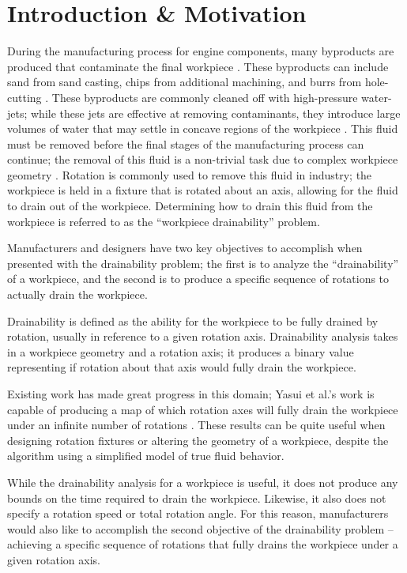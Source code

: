 							\chapter{Introduction \& Motivation}


During the manufacturing process for engine components, many byproducts are produced that contaminate the final workpiece \cite{Hancock94}. These byproducts can include sand from sand casting, chips from additional machining, and burrs from hole-cutting \cite{Arbelaez}.
These byproducts are commonly cleaned off with high-pressure water-jets; while these jets are effective at removing contaminants, they introduce large volumes of water that may settle in concave regions of the workpiece \cite{Arbelaez}. This fluid must be removed before the final stages of the manufacturing process can continue; the removal of this fluid is a non-trivial task due to complex workpiece geometry \cite{Avila} \cite{Yasui2011}. Rotation is commonly used to remove this fluid in industry; the workpiece is held in a fixture that is rotated about an axis, allowing for the fluid to drain out of the workpiece. Determining how to drain this fluid from the workpiece is referred to as the ``workpiece drainability'' problem.

Manufacturers and designers have two key objectives to accomplish when presented with the drainability problem; the first is to analyze the ``drainability'' of a workpiece, and the second is to produce a specific sequence of rotations to actually drain the workpiece.

Drainability is defined as the ability for the workpiece to be fully drained by rotation, usually in reference to a given rotation axis. Drainability analysis takes in a workpiece geometry and a rotation axis; it produces a binary value representing if rotation about that axis would fully drain the workpiece.

Existing work has made great progress in this domain; Yasui et al.'s work is capable of producing a map of which rotation axes will fully drain the workpiece under an infinite number of rotations \cite{Yasui2011}. These results can be quite useful when designing rotation fixtures or altering the geometry of a workpiece, despite the algorithm using a simplified model of true fluid behavior.

While the drainability analysis for a workpiece is useful, it does not produce any bounds on the time required to drain the workpiece. Likewise, it also does not specify a rotation speed or total rotation angle. For this reason, manufacturers would also like to accomplish the second objective of the drainability problem -- achieving a specific sequence of rotations that fully drains the workpiece under a given rotation axis.

